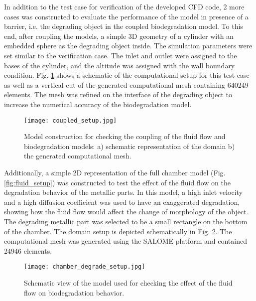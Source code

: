 In addition to the test case for verification of the developed CFD code, 2 more cases was constructed to evaluate the performance of the model in presence of a barrier, i.e. the degrading object in the coupled biodegradation model. To this end, after coupling the models, a simple 3D geometry of a cylinder with an embedded sphere as the degrading object inside. The simulation parameters were set similar to the verification case. The inlet and outlet were assigned to the bases of the cylinder, and the altitude was assigned with the wall boundary condition. Fig. \ref{fig:fluid_coupled_setup} shows a schematic of the computational setup for this test case as well as a vertical cut of the generated computational mesh containing \num{640249} elements. The mesh was refined on the interface of the degrading object to increase the numerical accuracy of the biodegradation model.


\begin{figure}[h]
\centering
\medskip
\texttt{[image: coupled\_setup.jpg]}
\caption[Model construction for checking the coupling of the fluid flow and biodegradation models]{Model construction for checking the coupling of the fluid flow and biodegradation models: a) schematic representation of the domain b) the generated computational mesh.} \label{fig:fluid_coupled_setup}
\end{figure}

Additionally, a simple 2D representation of the full chamber model (Fig. \ref{fig:fluid_setup}) was constructed to test the effect of the fluid flow on the degradation behavior of the metallic parts. In this model, a high inlet velocity and a high diffusion coefficient was used to have an exaggerated degradation, showing how the fluid flow would affect the change of morphology of the object. The degrading metallic part was selected to be a small rectangle on the bottom of the chamber. The domain setup is depicted schematically in Fig. \ref{fig:fluid_chamber_degrade_setup}. The computational mesh was generated using the SALOME platform and contained \num{24946} elements.

\begin{figure}[h]
\centering
\medskip
\texttt{[image: chamber\_degrade\_setup.jpg]}
\caption[Schematic view of the model for checking the effect of fluid flow on biodegradation behavior]{Schematic view of the model used for checking the effect of the fluid flow on biodegradation behavior.} \label{fig:fluid_chamber_degrade_setup}
\end{figure}

